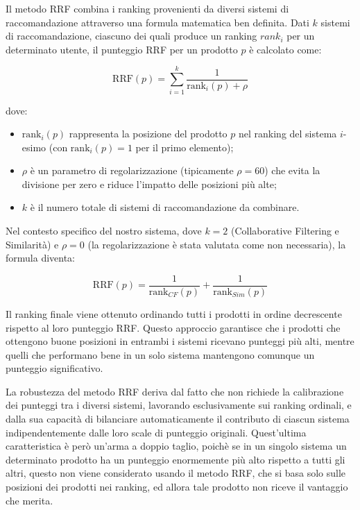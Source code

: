 Il metodo RRF combina i ranking provenienti da diversi sistemi di raccomandazione attraverso una formula matematica ben definita. Dati $k$ sistemi di raccomandazione, ciascuno dei quali produce un ranking $rank_i$ per un determinato utente, il punteggio RRF per un prodotto $p$ è calcolato come:

\begin{equation}
\text{RRF}(p) = \sum_{i=1}^{k} \frac{1}{\text{rank}_i(p) + \rho}
\end{equation}

dove:
\begin{itemize}
    \item $\text{rank}_i(p)$ rappresenta la posizione del prodotto $p$ nel ranking del sistema $i$-esimo (con $\text{rank}_i(p) = 1$ per il primo elemento);
    \item $\rho$ è un parametro di regolarizzazione (tipicamente $\rho = 60$) che evita la divisione per zero e riduce l'impatto delle posizioni più alte;
    \item $k$ è il numero totale di sistemi di raccomandazione da combinare.
\end{itemize}

Nel contesto specifico del nostro sistema, dove $k = 2$ (Collaborative Filtering e Similarità) e $\rho = 0$ (la regolarizzazione è stata valutata come non necessaria), la formula diventa:

\begin{equation}
\text{RRF}(p) = \frac{1}{\text{rank}_{CF}(p)} + \frac{1}{\text{rank}_{Sim}(p)}
\end{equation}

Il ranking finale viene ottenuto ordinando tutti i prodotti in ordine decrescente rispetto al loro punteggio RRF. Questo approccio garantisce che i prodotti che ottengono buone posizioni in entrambi i sistemi ricevano punteggi più alti, mentre quelli che performano bene in un solo sistema mantengono comunque un punteggio significativo.

La robustezza del metodo RRF deriva dal fatto che non richiede la calibrazione dei punteggi tra i diversi sistemi, lavorando esclusivamente sui ranking ordinali, e dalla sua capacità di bilanciare automaticamente il contributo di ciascun sistema indipendentemente dalle loro scale di punteggio originali. Quest'ultima caratteristica è però un'arma a doppio taglio, poichè se in un singolo sistema un determinato prodotto ha un punteggio enormemente più alto rispetto a tutti gli altri, questo non viene considerato usando il metodo RRF, che si basa solo sulle posizioni dei prodotti nei ranking, ed allora tale prodotto non riceve il vantaggio che merita.


